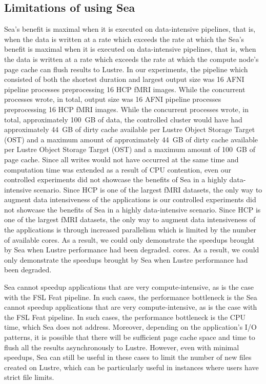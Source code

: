 \documentclass[fleqn,10pt]{wlscirep}
\begin{document}
    \subsection{Limitations of using Sea}
    
    Sea's benefit is maximal when it is executed on data-intensive pipelines, that is,
     when the data is written at a rate which exceeds the rate at which the
    Sea's benefit is maximal when it is executed on data-intensive pipelines, that is,
     when the data is written at a rate which exceeds the rate at which the
    compute node's page cache can flush results to Lustre. In our experiments,
    the pipeline which consisted of both the shortest duration and largest
    output size was 16 AFNI pipeline processes preprocessing 16 HCP fMRI images. While the concurrent processes wrote, in total,
    output size was 16 AFNI pipeline processes preprocessing 16 HCP fMRI images. While the concurrent processes wrote, in total,
    approximately 100~GB of data, the controlled cluster would have had
    approximately 44~GB of dirty cache available per Lustre Object Storage Target (OST) and a maximum amount of
    approximately 44~GB of dirty cache available per Lustre Object Storage Target (OST) and a maximum amount of
    100~GB of page cache. Since all writes would not have occurred at the same
    time and computation time was extended as a result of CPU contention, even
    our controlled experiments did not showcase the benefits of Sea in a highly
    data-intensive scenario. Since HCP is one of the largest fMRI datasets,
    the only way to augment data intensiveness of the applications is
    our controlled experiments did not showcase the benefits of Sea in a highly
    data-intensive scenario. Since HCP is one of the largest fMRI datasets,
    the only way to augment data intensiveness of the applications is
    through increased parallelism which is limited by the number of available
    cores. As a result, we could only demonstrate the speedups brought by Sea when
    Lustre performance had been degraded.
    cores. As a result, we could only demonstrate the speedups brought by Sea when
    Lustre performance had been degraded.


    Sea cannot speedup applications that are very compute-intensive, as is the case with the FSL Feat pipeline.
    In such cases, the performance bottleneck is the
    Sea cannot speedup applications that are very compute-intensive, as is the case with the FSL Feat pipeline.
    In such cases, the performance bottleneck is the
    CPU time, which Sea does not address. Moreover, depending on the
    application's I/O patterns, it is possible that there will be sufficient
    page cache space and time to flush all the results asynchronously
    to Lustre. However, even with minimal speedups, Sea can still be useful in
    these cases to limit the number of new files created on Lustre, which can be
    particularly useful in instances where users have strict file limits.
\end{document}
